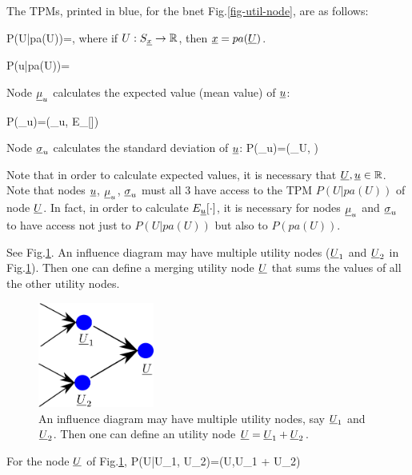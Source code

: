 The TPMs,
printed in blue,
for the bnet Fig.\ref{fig-util-node},
are as follows:

\beq\color{blue}
P(U|pa(U))=\delta[U, U(pa(U))]
\;,
\eeq
where if $U:S_{\underline{x}}\rightarrow { \mathbb{R}}$,
then ${\underline{x}}=pa({\underline{U}})$.

\beq\color{blue}
P(u|pa(U))=
\delta[u, U(pa(U))]
\eeq

Node $\underline{\mu}_u$
calculates the
expected value (mean value) of ${\underline{u}}$:

\beq\color{blue}
P(\mu_u)=\delta(\mu_u,
E_{\rvu}[\rvu])
\eeq

Node $\underline{\sigma}_u$
calculates the
standard deviation of ${\underline{u}}$:
\beq\color{blue}
P(\sigma_u)=\delta(\sigma_U,
)
\eeq

Note that in order to
calculate expected values,
it is necessary that
${\underline{U}}, {\underline{u}}\in { \mathbb{R}}$. Note that
nodes ${\underline{u}}$, $\underline{\mu}_u$, $\underline{\sigma}_u$
must all 3 have access
to the 
TPM
$P(U|pa(U))$ of node ${\underline{U}}$.
In fact, in order  to
calculate $E_{\underline{u}}[\cdot]$,
it is necessary for
nodes $\underline{\mu}_u$ and 
 $\underline{\sigma}_u$
to have access not just to 
$P(U|pa(U))$ but also to
$P(pa(U))$.

See Fig.\ref{fig-util-merge}.
An influence
diagram may have multiple
utility nodes (${\underline{U}}_1$ and
${\underline{U}}_2$ in Fig.\ref{fig-util-merge}).
Then one can define a merging
utility node ${\underline{U}}$ that sums
the values of
all the other utility 
nodes.

\begin{figure}[h!]
\centering
\includegraphics[width=1.5in]
{inf-dia/util-merge.png}
\caption{An influence
diagram may have multiple
utility nodes, say ${\underline{U}}_1$ and
${\underline{U}}_2$. Then
one can define an
utility node ${\underline{U}}={\underline{U}}_1 + {\underline{U}}_2$. } 
\label{fig-util-merge}
\end{figure}

For the node ${\underline{U}}$ of 
Fig.\ref{fig-util-merge},
\beq\color{blue}
P(U|U_1, U_2)=\delta(U,U_1 + U_2)
\eeq